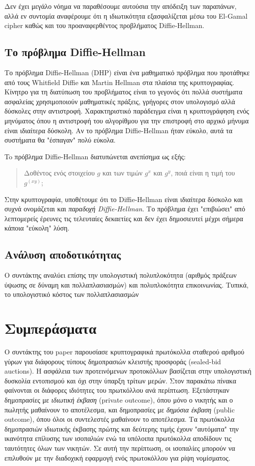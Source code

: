 \documentclass[letterpaper,11pt]{article}
\begin{document}
Δεν έχει μεγάλο νόημα να παραθέσουμε αυτούσια την απόδειξη των παραπάνων, αλλά εν συντομία αναφέρουμε ότι η ιδιωτικότητα εξασφαλίζεται μέσω του
El-Gamal cipher καθώς και του προαναφερθέντος προβλήματος Diffie-Hellman.

\subsection{Το πρόβλημα Diffie-Hellman}

Το πρόβλημα Diffie-Hellman (DHP) είναι ένα μαθηματικό πρόβλημα που προτάθηκε από τους Whitfield Diffie και Martin Hellman στα πλαίσια της
κρυπτογραφίας. Κίνητρο για τη διατύπωση του προβλήματος είναι το γεγονός ότι πολλά συστήματα ασφαλείας χρησιμοποιούν μαθηματικές πράξεις, γρήγορες
στον υπολογισμό αλλά δύσκολες στην αντιστροφή. Χαρακτηριστικό παράδειγμα είναι η κρυπτογράφηση ενός μηνύματος όπου η αντιστροφή του αλγορίθμου για
την επιστροφή στο αρχικό μήνυμα είναι ιδιαίτερα δύσκολη. Αν το πρόβλημα Diffie-Hellman ήταν εύκολο, αυτά τα συστήματα θα "έσπαγαν" πολύ εύκολα.

To πρόβλημα Diffie-Hellman διατυπώνεται ανεπίσημα ως εξής:

 \begin{quote} Δοθέντος ενός στοιχείου $g$ και των τιμών $g^x$ και $g^y$, ποιά είναι η τιμή του $g^(xy)$; \end{quote}

Στην κρυπτογραφία, υποθέτουμε ότι το Diffie-Hellman είναι ιδιαίτερα δύσκολο και συχνά ονομάζεται και \emph{παραδοχή Diffie-Hellman}. Το πρόβλημα
έχει "επιβιώσει" από λεπτομερείς έρευνες τις τελευταίες δεκαετίες και δεν έχει δημοσιευτεί μέχρι σήμερα κάποια "εύκολη" λύση.

\subsection{Ανάλυση αποδοτικότητας}

Ο συντάκτης αναλύει επίσης την υπολογιστική πολυπλοκότητα (αριθμός πράξεων ύψωσης σε δύναμη και πολλαπλασιασμών) και πολυπλοκότητα επικοινωνίας.
Τυπικά, το υπολογιστικό κόστος των πολλαπλασιασμών 

\section{Συμπεράσματα} Ο συντάκτης του paper παρουσίασε κρυπτογραφικά πρωτόκολλα σταθερού αριθμού γύρων για διάφορους τύπους δημοπρασιών κλειστής
προσφοράς (sealed-bid auctions). Η ασφάλεια των προτεινόμενων προτοκόλλων βασίζεται στην υπολογιστική δυσκολία εντοπισμού και όχι στην ύπαρξη
τρίτων μερών. Στον παρακάτω πίνακα φαίνονται οι διάφορες ιδιότητες του πρωτκόλλου ανά περίπτωση. Εξετάστηκαν δημοπρασίες με \emph{ιδιωτική έκβαση}
(private outcome), όπου μόνο ο νικητής και ο πωλητής μαθαίνουν το αποτέλεσμα, και δημοπρασίες με \emph{δημόσια έκβαση} (public outcome), όπου όλοι
οι συντελεστές μαθαίνουν το αποτέλεσμα. Τα πρωτόκολλα δημοπρασιών ιδιωτικής έκβασης πρώτης και δεύτερης τιμής έχουν "αυτόματα" την ικανότητα
επίλυσης των ισοπαλιών ενώ τα υπόλοιπα πρωτόκολλα αποδίδουν τις ταυτότητες όλων των νικητών. Σε αυτή την περίπτωση, οι ισοπαλίες μπορούν να
επιλυθούν με την διαδοχική εφαρμογή ενός πρωτοκόλλου για ρίψη νομίσματος.
\end{document}
